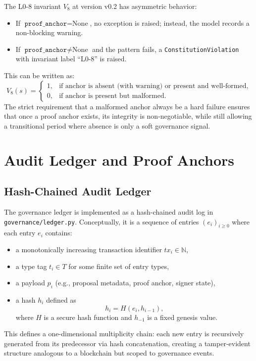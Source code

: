 \documentclass[11pt]{article}
\begin{document}
The L0-8 invariant \(V_8\) at version v0.2 has asymmetric behavior:
\begin{itemize}[nosep]
  \item If \(\texttt{proof\_anchor} = \text{None}\), no exception is raised; instead, the model records a non-blocking warning.
  \item If \(\texttt{proof\_anchor}\neq\text{None}\) and the pattern fails, a \texttt{ConstitutionViolation} with invariant label ``L0-8'' is raised.\cite{cite:41}
\end{itemize}
This can be written as:
\[
  V_8(s) =
  \begin{cases}
    1, & \text{if anchor is absent (with warning) or present and well-formed},\\
    0, & \text{if anchor is present but malformed}.
  \end{cases}
\]
The strict requirement that a malformed anchor always be a hard failure ensures that once a proof anchor exists, its integrity is non-negotiable, while still allowing a transitional period where absence is only a soft governance signal.\cite{cite:41,cite:46,cite:47}


\section{Audit Ledger and Proof Anchors}

\subsection{Hash-Chained Audit Ledger}

The governance ledger is implemented as a hash-chained audit log in \texttt{governance/ledger.py}.\cite{cite:41} Conceptually, it is a sequence of entries \((e_i)_{i\ge 0}\) where each entry \(e_i\) contains:
\begin{itemize}[nosep]
  \item a monotonically increasing transaction identifier \(tx_i\in\mathbb{N}\),
  \item a type tag \(t_i\in T\) for some finite set of entry types,
  \item a payload \(p_i\) (e.g., proposal metadata, proof anchor, signer state),
  \item a hash \(h_i\) defined as
  \[
    h_i = H(e_i, h_{i-1}),
  \]
  where \(H\) is a secure hash function and \(h_{-1}\) is a fixed genesis value.
\end{itemize}
This defines a one-dimensional multiplicity chain: each new entry is recursively generated from its predecessor via hash concatenation, creating a tamper-evident structure analogous to a blockchain but scoped to governance events.
\end{document}
